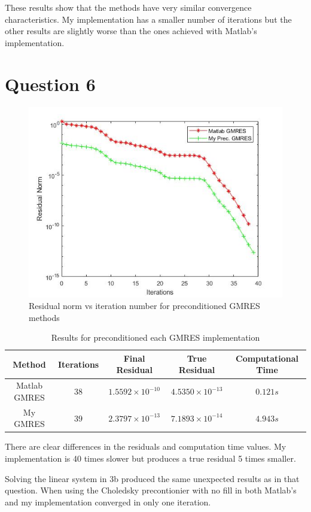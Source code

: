 \documentclass[a4paper, 11pt]{article}
\begin{document}
			These results show that the methods have very similar convergence characteristics.
			My implementation has a smaller number of iterations but the other results are slightly worse than the ones achieved with Matlab's implementation.
			
		
		\section*{Question 6}
			\begin{figure}[H]
				\centering
				\includegraphics[width=.6\linewidth]{ex6.jpg}
				\caption{Residual norm vs iteration number for preconditioned GMRES methods}
				\label{fig:ex6}
			\end{figure}
			
			\begin{table}[H]
				\centering
				\begin{tabular}{c|c|c|c|c}
					\textbf{Method} &  \textbf{Iterations} 	& \textbf{Final Residual} 	 & \textbf{True Residual}		& \textbf{Computational Time} 	\\ \hline
					Matlab GMRES	& 			$38$ 		& $ 1.5592 \times 10^{-10} $ & $ 4.5350 \times 10^{-13} $	& $ 0.121 s $	\\ \hline
					My GMRES		& 			$39$ 		& $ 2.3797 \times 10^{-13} $ & $ 7.1893 \times 10^{-14} $	& $ 4.943 s $	\\ 
				\end{tabular}
				\caption{Results for preconditioned each GMRES implementation}
				\label{table:ex6}
			\end{table}
			
			There are clear differences in the residuals and computation time values.
			My implementation is 40 times slower but produces a true residual 5 times smaller.		
		
		
		Solving the linear system in 3b produced the same unexpected results as in that question.
		When using the Choledsky precontionier with no fill in both Matlab's and my implementation converged in only one iteration.
		
\end{document}
